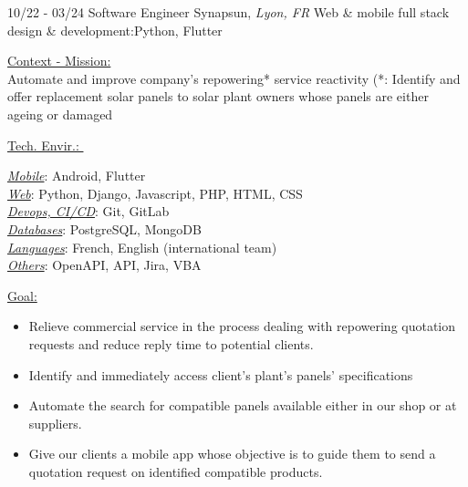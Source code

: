 \documentclass[]{friggeri-cv}
\begin{document}
\begin{entrylist}
  \entry
    {10/22 - 03/24}
    {Software Engineer}
    {Synapsun, \textit{Lyon, FR}}
    {Web \& mobile full stack design \& development:\hspace*{1mm}Python, Flutter}
\end{entrylist}
\vspace{-10pt}
\begin{minipage}[t]{0.65\linewidth}
\underline{Context - Mission: }\\
Automate and improve company's repowering* service reactivity (*: Identify and offer replacement solar panels to solar plant owners whose panels are either ageing or damaged\\
\end{minipage} %
\begin{minipage}[t]{0.38\textwidth}
    \underline{Tech. Envir.: }\
    \vspace{1mm}
    
\underline{\textit{Mobile}}: Android, Flutter\\
\underline{\textit{Web}}: Python, Django, Javascript, PHP, HTML, CSS\\
\underline{\textit{Devops, CI/CD}}: Git, GitLab\\
\underline{\textit{Databases}}: PostgreSQL, MongoDB\\
\underline{\textit{Languages}}: French, English (international team)\\
\underline{\textit{Others}}: OpenAPI, API, Jira, VBA
    \end{minipage}
\vspace{1.5mm}
\underline{Goal: }\\

\begin{itemize}
\setlength{\itemsep}{1pt}
\setlength{\parskip}{0pt}
\setlength{\parsep}{0pt}

\item Relieve commercial service in the process dealing with repowering quotation requests and reduce reply time to potential clients.
\item Identify and immediately access client's plant's panels' specifications
\item Automate the search for compatible panels available either in our shop or at suppliers.
\item Give our clients a mobile app whose objective is to guide them to send a quotation request on identified compatible products.
\end{itemize}
\end{document}
